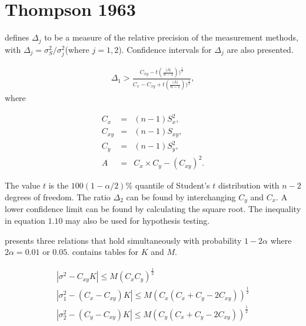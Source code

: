 \documentclass[12pt, a4paper]{report}
\theoremstyle{plain}
\theoremstyle{definition}
\theoremstyle{remark}
\begin{document}
	
	

	
	
	
	
	

		\section{Thompson 1963}
		
		
		\citet{Thompson} defines $\Delta_{j}$ to be a measure of the
		relative precision of the measurement methods, with $\Delta_{j}=
		\sigma^2_{S}/\sigma^2_{j}$(where $j=1,2$). Confidence intervals
		for $\Delta_{j}$ are also presented.
		
		\begin{eqnarray}
		\Delta_{1} > \frac{C_{xy}-
			t(\frac{|A|}{n-1}))^{\frac{1}{2}}}{C_{x}-C_{xy}+
			t(\frac{|A|}{n-1}))^{\frac{1}{2}}},
		\end{eqnarray}
		where
		
		\begin{eqnarray}
		C_{x}&=&(n-1)S^2_{x},\nonumber\\
		C_{xy}&=&(n-1)S_{xy},\nonumber\\
		C_{y}&=&(n-1)S^2_{y},\nonumber\\
		A &=& C_{x}\times C_{y} - (C_{xy})^2 . \nonumber
		\end{eqnarray}
		
		The value $t$ is the $100(1-\alpha/2)\%$ quantile of Student's $t$
		distribution with $n-2$ degrees of freedom. The ratio $\Delta_{2}$
		can be found by interchanging $C_{y}$ and $C_{x}$. A lower
		confidence limit can be found by calculating the square root. The
		inequality in equation $1.10$ may also be used for hypothesis
		testing.
		
		\citet{Thompson} presents three relations that hold simultaneously
		with probability $1-2\alpha$ where $2\alpha=0.01$ or $0.05$. \citet{Thompson} contains tables for $K$ and $M$.
		
		\begin{eqnarray}
			|\sigma^2-C_{xy}K|\leqslant M(C_{x}C_{y})^{\frac{1}{2}}\\
			|\sigma^2_{1}-(C_{x}-C_{xy})K|\leqslant M(C_{x}(C_{x}+C_{y}-2C_{xy}))^{\frac{1}{2}}\nonumber\\
			|\sigma^2_{2}-(C_{y}-C_{xy})K|\leqslant
			M(C_{y}(C_{x}+C_{y}-2C_{xy}))^{\frac{1}{2}}\nonumber
		\end{eqnarray}
		
\end{document}
